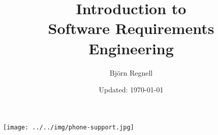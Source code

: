 \documentclass{reqengbook}
\title{
\bf\sffamily\fontsize{25}{30}\selectfont
Introduction to\\Software Requirements Engineering
}
\author{\sffamily\fontsize{20}{30}\selectfont Björn Regnell}
\date{\vspace{2em}\sffamily Updated: \today}
\begin{document}

\begin{minipage}{0.5\textwidth}
  \maketitle%
\end{minipage}%
\begin{minipage}{0.5\textwidth}
  \centering\vspace{2.2cm}
  \texttt{[image: ../../img/phone-support.jpg]}%
\end{minipage}%
\pagebreak


\setcounter{tocdepth}{2}

\begin{multicols*}{2}  %
\footnotesize
\tableofcontents
\end{multicols*}



\end{document}

